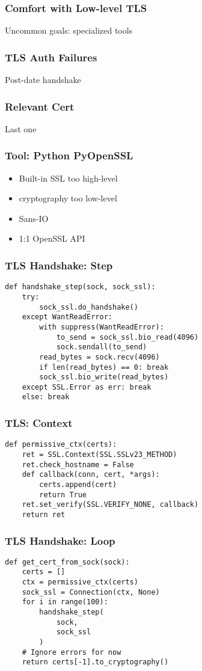 \begin{frame}
\frametitle{Comfort with Low-level TLS}

Uncommon goals: specialized tools
\end{frame}

\begin{frame}
\frametitle{TLS Auth Failures}
Post-date handshake
\end{frame}

\begin{frame}
\frametitle{Relevant Cert}
Last one
\end{frame}

\begin{frame}
\frametitle{Tool: Python PyOpenSSL}

\begin{itemize}
\item Built-in SSL too high-level
\item cryptography too low-level
\item Sans-IO
\item 1:1 OpenSSL API
\end{itemize}

\end{frame}

\begin{frame}[fragile]
\frametitle{TLS Handshake: Step}
\begin{lstlisting}
def handshake_step(sock, sock_ssl):
    try:
        sock_ssl.do_handshake()
    except WantReadError:
        with suppress(WantReadError):
            to_send = sock_ssl.bio_read(4096)
            sock.sendall(to_send)
        read_bytes = sock.recv(4096)
        if len(read_bytes) == 0: break
        sock_ssl.bio_write(read_bytes)
    except SSL.Error as err: break
    else: break
\end{lstlisting}
\end{frame}

\begin{frame}[fragile]
\frametitle{TLS: Context}
\begin{lstlisting}
def permissive_ctx(certs):
    ret = SSL.Context(SSL.SSLv23_METHOD)
    ret.check_hostname = False
    def callback(conn, cert, *args):
        certs.append(cert)
        return True
    ret.set_verify(SSL.VERIFY_NONE, callback)
    return ret
\end{lstlisting}
\end{frame}

\begin{frame}[fragile]
\frametitle{TLS Handshake: Loop}
\begin{lstlisting}
def get_cert_from_sock(sock): 
    certs = []
    ctx = permissive_ctx(certs)
    sock_ssl = Connection(ctx, None)
    for i in range(100):
        handshake_step(
            sock,
            sock_ssl
        )
    # Ignore errors for now
    return certs[-1].to_cryptography()
\end{lstlisting}
\end{frame}

